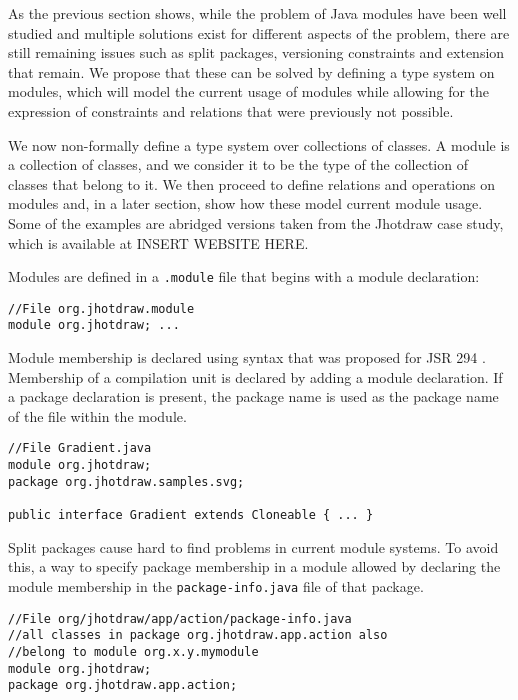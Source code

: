 
As the previous section shows, while the problem of Java modules have been
well studied and multiple solutions exist for different aspects of the problem,
there are still remaining issues such as split packages, versioning constraints 
and extension that remain. We propose that these can be solved by
defining a type system on modules, which will model the current usage
of modules while allowing for the expression of constraints and relations
that were previously not possible.

We now non-formally define a type system over collections of classes. 
A module is a collection of classes, and we consider it to be the type of 
the collection of classes that belong to it. We then proceed to define
relations and operations on modules and, in a later section, show how
these model current module usage. Some of the examples are abridged versions 
taken from the Jhotdraw case study, which is available at INSERT WEBSITE HERE.


Modules are defined in a {\tt .module} file that begins with a module
declaration:

\begin{lstlisting}
//File org.jhotdraw.module
module org.jhotdraw; ...
\end{lstlisting}

Module membership is declared using syntax that was proposed 
for JSR 294 \cite{superpackageChange}. Membership of a compilation unit is 
declared by adding a module declaration. If a package declaration is present, 
the package name is used as the package name of the file within the module.

\begin{lstlisting}
//File Gradient.java
module org.jhotdraw;
package org.jhotdraw.samples.svg;

public interface Gradient extends Cloneable { ... }
\end{lstlisting}

Split packages cause hard to find problems in current module systems\cite{iJAMComments}. To avoid this, 
a way to specify package membership in a module allowed by declaring the module membership
in the {\tt package-info.java} file of that package.

\begin{lstlisting}
//File org/jhotdraw/app/action/package-info.java
//all classes in package org.jhotdraw.app.action also
//belong to module org.x.y.mymodule
module org.jhotdraw;
package org.jhotdraw.app.action;
\end{lstlisting}

